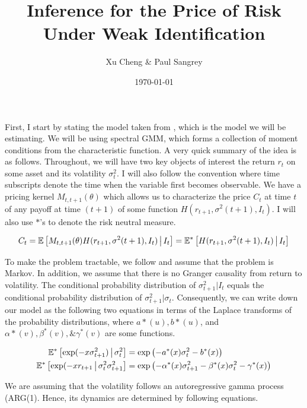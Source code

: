 \documentclass[11pt]{article}
\author{Xu Cheng  \& Paul Sangrey}
\title{Inference for the Price of Risk Under Weak Identification}
\date{\today}
\newcommand*{\E}{\mathbb{E}}
\newcommand{\mvert}[1][\middle]{\ensuremath{\,#1\vert\,}}
\begin{document}
\maketitle

First, I start by stating the model taken from  \textcite[Section 5.1]{khrapov2016affine}, which is the model we
will be estimating. 
We will be using spectral GMM, which forms a collection of moment conditions from the characteristic function.
A very quick summary of the idea is as follows. 
Throughout, we will have two key objects of interest the return $r_t$ on some asset and its volatility
$\sigma^2_t$.
I will also follow the convention where time subscripts denote the time when the variable first becomes
observable.
We have a pricing kernel $M_{t, t+1}(\theta)$ which allows us to characterize the price $C_t$ at time $t$ of any
payoff at time $(t+1)$ of some function $H(r_{t+1}, \sigma^2(t+1),  I_t)$. 
I will also use $*$'s to denote the risk neutral measure.

\begin{equation}
    C_t  = \E\left[M_{t,t+1}(\theta) H(r_{t+1}, \sigma^2(t+1),  I_t) \mvert I_t \right] = \E^{*}\left[H(r_{t+1},
    \sigma^2(t+1),  I_t) \mvert I_t \right] 
\end{equation}


To make the problem tractable, we follow \textcite[Section 5.1]{khrapov2016affine} and assume that the problem is
Markov.  
In addition, we assume that there is no Granger causality from return to volatility. 
The conditional probability distribution of $\sigma^2_{t+1} \vert I_t$ equals the conditional probability
distribution of $\sigma^2_{t+1} \vert \sigma_t$.
Consequently, we can write down our model as the following two equations in terms of the Laplace transforms of the
probability distributions, where $a*(u), b*(u)$, and $\alpha{*}(v), \beta^{*}(v), \& \gamma^{*}(v)$ are some
functions.

\begin{align}
    \E^{*}\left[\exp(-x \sigma^2_{t+1}) \mvert \sigma^2_t\right] &= \exp\left(-a^{*}(x) \sigma_t^2 -
    b^{*}(x)\right) \\
    \E^{*}\left[\exp(-x r_{t+1} \mvert \sigma^2_t \sigma^2_{t+1}\right] &= \exp\left(-\alpha^{*}(x) \sigma^2_{t+1}
        - \beta^{*}(x) \sigma^2_t - \gamma^{*}(x)\right)
\end{align}

We are assuming that the volatility follows an autoregressive gamma process (ARG(1).
Hence, its dynamics are determined by following equations.
\end{document}
